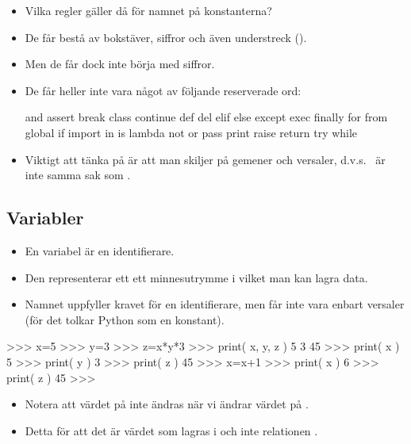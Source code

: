 \documentclass{beamer}
\begin{document}
\begin{frame}{\insertsubsectionhead}
  \begin{itemize}
    \item Vilka regler gäller då för namnet på konstanterna?
    \item De får bestå av bokstäver, siffror och även understreck (\code{_}).
    \item Men de får dock inte börja med siffror.
    \item De får heller inte vara något av följande reserverade ord:
      \begin{code}
and assert break class continue def del elif
else except exec finally for from global if
import in is lambda not or pass print raise
return try while
      \end{code}
    \item Viktigt att tänka på är att man skiljer på gemener och versaler, 
      d.v.s.\  är inte samma sak som .
  \end{itemize}
\end{frame}

\subsection{Variabler}

\begin{frame}{\insertsubsectionhead}
  \begin{itemize}
    \item En variabel är en identifierare.
    \item Den representerar ett ett minnesutrymme i vilket man kan lagra data.
    \item Namnet uppfyller kravet för en identifierare, men får inte vara 
      enbart versaler (för det tolkar Python som en konstant).
  \end{itemize}
\end{frame}

\begin{frame}[fragile]{\insertsubsectionhead}
  \begin{terminal}
>>> x=5
>>> y=3
>>> z=x*y*3
>>> print( x, y, z )
5 3 45
>>> print( x )
5
>>> print( y )
3
>>> print( z )
45
>>> x=x+1
>>> print( x )
6
>>> print( z )
45
>>>
  \end{terminal}
\end{frame}

\begin{frame}{\insertsubsectionhead}
  \begin{itemize}
    \item Notera att värdet på  inte ändras när vi ändrar värdet på 
      .

    \item Detta för att det är värdet  som lagras i  och inte 
      relationen .

  \end{itemize}
\end{frame}
\end{document}

